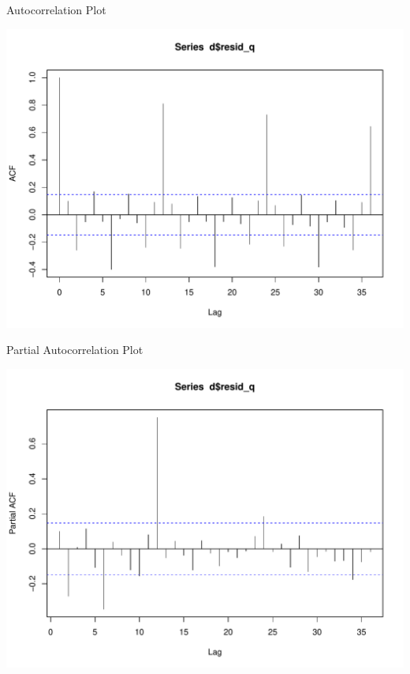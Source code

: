 \documentclass[11pt,ignorenonframetext,]{beamer}
\begin{document}
\begin{frame}{Autocorrelation Plot}

\includegraphics{Lec6_files/figure-beamer/unnamed-chunk-13-1.pdf}

\end{frame}

\begin{frame}{Partial Autocorrelation Plot}

\includegraphics{Lec6_files/figure-beamer/unnamed-chunk-14-1.pdf}

\end{frame}
\end{document}
